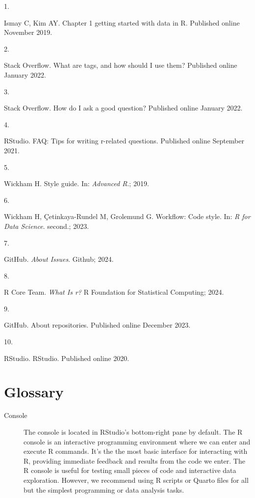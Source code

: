 \documentclass[
  letterpaper,
  DIV=11,
  numbers=noendperiod]{scrreprt}
\newlength{\cslhangindent}
\newlength{\csllabelwidth}
\newenvironment{CSLReferences}[2] %
 {\begin{list}{}{%
  \setlength{\itemindent}{0pt}
  \setlength{\leftmargin}{0pt}
  \setlength{\parsep}{0pt}
  \ifodd #1
   \setlength{\leftmargin}{\cslhangindent}
   \setlength{\itemindent}{-1\cslhangindent}
  \fi
  \setlength{\itemsep}{#2\baselineskip}}}
 {\end{list}}
\newcommand{\CSLLeftMargin}[1]{\parbox[t]{\csllabelwidth}{\strut#1\strut}}
\newcommand{\CSLRightInline}[1]{\parbox[t]{\linewidth - \csllabelwidth}{\strut#1\strut}}
\begin{document}
\label{refs}
\begin{CSLReferences}{0}{1}
\CSLLeftMargin{1. }%
\CSLRightInline{Ismay C, Kim AY. Chapter 1 getting started with data in
{R}. Published online November 2019.}

\CSLLeftMargin{2. }%
\CSLRightInline{Stack Overflow. What are tags, and how should {I} use
them? Published online January 2022.}

\CSLLeftMargin{3. }%
\CSLRightInline{Stack Overflow. How do {I} ask a good question?
Published online January 2022.}

\CSLLeftMargin{4. }%
\CSLRightInline{RStudio. {FAQ}: Tips for writing r-related questions.
Published online September 2021.}

\CSLLeftMargin{5. }%
\CSLRightInline{Wickham H. Style guide. In: \emph{Advanced {R}}.; 2019.}

\CSLLeftMargin{6. }%
\CSLRightInline{Wickham H, Çetinkaya-Rundel M, Grolemund G. Workflow:
Code style. In: \emph{{R} for Data Science}. second.; 2023.}

\CSLLeftMargin{7. }%
\CSLRightInline{GitHub. \emph{About Issues}. Github; 2024.}

\CSLLeftMargin{8. }%
\CSLRightInline{R Core Team. \emph{What Is r?} R Foundation for
Statistical Computing; 2024.}

\CSLLeftMargin{9. }%
\CSLRightInline{GitHub. About repositories. Published online December
2023.}

\CSLLeftMargin{10. }%
\CSLRightInline{RStudio. {RStudio}. Published online 2020.}

\end{CSLReferences}

\cleardoublepage
{}
{}
\appendix

\chapter{Glossary}\label{sec-glossary}

\begin{description}
\item[\label{glossary-console}{Console}]
The console is located in RStudio's bottom-right pane by default. The R
console is an interactive programming environment where we can enter and
execute R commands. It's the the most basic interface for interacting
with R, providing immediate feedback and results from the code we enter.
The R console is useful for testing small pieces of code and interactive
data exploration. However, we recommend using R scripts or Quarto files
for all but the simplest programming or data analysis tasks.
\end{description}
\end{document}
